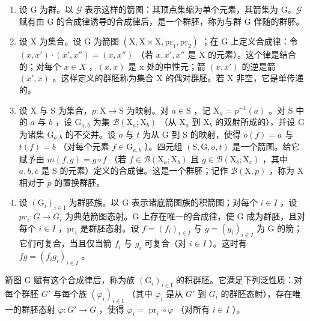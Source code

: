 \begin{enumerate}
\def\labelenumi{\arabic{enumi})}
\item
  设 G 为群。以 \(\mathcal{G}\) 表示这样的箭图：其顶点集缩为单个元素，其箭集为 G。\(\mathcal{G}\) 赋有由 G 的合成律诱导的合成律后，是一个群胚，称为与群 G 伴随的群胚。
\item
  设 X 为集合。设 G 为箭图 \((\mathrm{X}, \mathrm{X} \times \mathrm{X}, \mathrm{pr}_{1}, \mathrm{pr}_{2})\) ；在 G 上定义合成律：令 \((x, x') \cdot (x', x'') = (x, x'')\) （若 \(x, x', x''\) 是 X 的元素）。这个律是结合的；对每个 \(x \in X\) ，\((x, x)\) 是 x 处的中性元；箭 \((x, x')\) 的逆是箭 \((x', x)\) 。这样定义的群胚称为集合 X 的偶对群胚。若 X 非空，它是单传递的。
\item
  设 X 与 S 为集合，\(p \colon \mathrm{X} \to \mathrm{S}\) 为映射。对 \(a \in \mathrm{S}\) ，记 \(\mathrm{X}_a = p^{-1}(a)\) 。对 S 中的 \(a\) 与 \(b\) ，设 \(\mathrm{G}_{a,b}\) 为集 \(\mathcal{B}(\mathrm{X}_a; \mathrm{X}_b)\) （从 \(\mathrm{X}_a\) 到 \(\mathrm{X}_b\) 的双射所成的），并设 G 为诸集 \(\mathrm{G}_{a,b}\) 的不交并。设 \(o\) 与 \(t\) 为从 G 到 S 的映射，使得 \(o(f) = a\) 与 \(t(f) = b\) （对每个元素 \(f \in \mathrm{G}_{a,b}\) ）。四元组 \((\mathrm{S}, \mathrm{G}, o, t)\) 是一个箭图。给它赋予由 \(m(f, g) = g \circ f\) （若 \(f \in \mathcal{B}(\mathrm{X}_a; \mathrm{X}_b)\) 且 \(g \in \mathcal{B}(\mathrm{X}_b; \mathrm{X}_c)\) ，其中 \(a, b, c\) 是 S 的元素）定义的合成律。这是一个群胚；记作 \(\mathcal{B}(\mathrm{X}, p)\) ，称为 X 相对于 \(p\) 的置换群胚。
\item
  设 \((\mathrm{G}_{i})_{i\in\mathrm{I}}\) 为群胚族。以 G 表示诸底箭图族的积箭图；对每个 \(i\in I\) ，设 \(pr_{i}\colon G\to G_{i}\) 为典范箭图态射。G 上存在唯一的合成律，使 G 成为群胚，且对每个 \(i \in I\) ，\(\mathrm{pr}_i\) 是群胚态射。设 \(f = (f_i)_{i \in I}\) 与 \(g = (g_i)_{i \in I}\) 为 G 的箭；它们可复合，当且仅当箭 \(f_i\) 与 \(g_i\) 可复合（对 \(i \in I\) ）。这时有 \(fg = (f_i g_i)_{i \in I}\) 。
\end{enumerate}

箭图 G 赋有这个合成律后，称为族 \((\mathrm{G}_{i})_{i\in\mathrm{I}}\) 的积群胚。它满足下列泛性质：对每个群胚 \(G'\) 与每个族 \((\varphi_{i})_{i\in\mathrm{I}}\) （其中 \(\varphi_{i}\) 是从 \(G'\) 到 \(G_{i}\) 的群胚态射），存在唯一的群胚态射 \(\varphi: G'\to G\) ，使得 \(\varphi_{i}=\operatorname{pr}_{i}\circ\varphi\) （对所有 \(i\in I\) ）。


